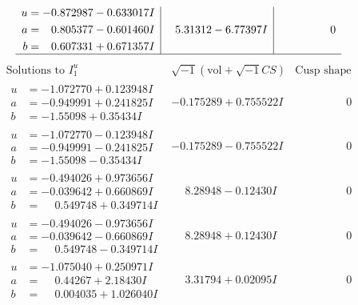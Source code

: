\documentclass[1p]{elsarticle_modified}
\theoremstyle{definition}
\newcommand{\I}{\sqrt{-1}}
\begin{document}
$$\begin{array}{c|c|c}
\begin{aligned}
u &= -0.872987 - 0.633017 I \\
a &= \phantom{-}0.805377 - 0.601460 I \\
b &= \phantom{-}0.607331 + 0.671357 I\end{aligned}
 & \phantom{-}5.31312 - 6.77397 I & \phantom{-0.000000 } 0\\
 \hline 
 \end{array}$$\newpage$$\begin{array}{c|c|c}  
\text{Solutions to }I^u_{1}& \I (\text{vol} + \sqrt{-1}CS) & \text{Cusp shape}\\
 \hline 
\begin{aligned}
u &= -1.072770 + 0.123948 I \\
a &= -0.949991 + 0.241825 I \\
b &= -1.55098 + 0.35434 I\end{aligned}
 & -0.175289 + 0.755522 I & \phantom{-0.000000 } 0 \\ \hline\begin{aligned}
u &= -1.072770 - 0.123948 I \\
a &= -0.949991 - 0.241825 I \\
b &= -1.55098 - 0.35434 I\end{aligned}
 & -0.175289 - 0.755522 I & \phantom{-0.000000 } 0 \\ \hline\begin{aligned}
u &= -0.494026 + 0.973656 I \\
a &= -0.039642 + 0.660869 I \\
b &= \phantom{-}0.549748 + 0.349714 I\end{aligned}
 & \phantom{-}8.28948 - 0.12430 I & \phantom{-0.000000 } 0 \\ \hline\begin{aligned}
u &= -0.494026 - 0.973656 I \\
a &= -0.039642 - 0.660869 I \\
b &= \phantom{-}0.549748 - 0.349714 I\end{aligned}
 & \phantom{-}8.28948 + 0.12430 I & \phantom{-0.000000 } 0 \\ \hline\begin{aligned}
u &= -1.075040 + 0.250971 I \\
a &= \phantom{-}0.44267 + 2.18430 I \\
b &= \phantom{-}0.004035 + 1.026040 I\end{aligned}
 & \phantom{-}3.31794 + 0.02095 I & \phantom{-0.000000 } 0 \\ \hline\begin{aligned}

\end{aligned}
\end{array}$$
\end{document}
